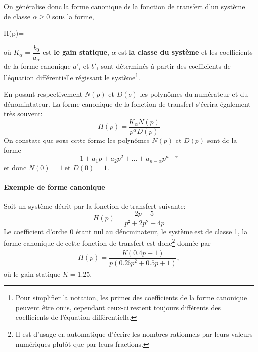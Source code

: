 On généralise donc la forme canonique de la fonction de transfert d'un 
système de classe $\alpha\ge0$ sous la forme, 
\begin{bequation}
    H(p)=
    \cdot
    \label{eq-ftcan} 
\end{bequation}
où $K_\alpha=\dfrac{b_0}{a_\alpha}$ est \textbf{le gain statique}, 
$\alpha$ est \textbf{la classe du système} et les coefficients de la forme 
canonique $a'_i$ et $b'_i$ sont déterminés à partir des coefficients 
de l'équation différentielle régissant le système\footnote{Pour simplifier 
la notation, les primes des coefficients de la forme canonique peuvent 
être omis, cependant ceux-ci restent toujours différents des coefficients 
de l'équation différentielle.}.

En posant respectivement $N(p)$ et $D(p)$ les polynômes du numérateur 
et du dénomintateur. La forme canonique de la fonction de transfert 
s'écrira également très souvent:
\[
    H(p)=\dfrac{K_\alpha N(p)}{p^\alpha D(p)}
\]
On constate que sous cette forme les polynômes $N(p)$ et $D(p)$ sont 
de la forme 
\[
    1+a_1p+a_2p^2+\ldots+a_{n-\alpha}p^{n-\alpha}
\]
et donc $N(0)=1$ et $D(0)=1$.
\paragraph{Exemple de forme canonique}
Soit un système décrit par la fonction de transfert suivante:
\[
    H(p)=\dfrac{2p+5}{p^3+2p^2+4p}
\]
Le coefficient d'ordre 0 étant nul au dénominateur, le système est de classe 1, 
la forme canonique de cette fonction de transfert est 
donc\footnote{Il est d'usage en automatique d'écrire les nombres rationnels 
par leurs valeurs numériques plutôt que par leurs fractions. } donnée par
\begin{align*}
    H(p)=\dfrac{K(0.4p+1)}{p(0.25p^2+0.5p+1)},
\end{align*}
où le gain statique $K=$1.25.
